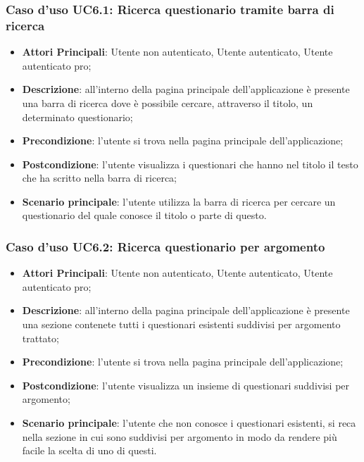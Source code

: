 \subsubsection{Caso d'uso UC6.1: Ricerca questionario tramite barra di ricerca}
\label{UC6.1}
\begin{itemize}
\item\textbf{Attori Principali}: Utente non autenticato, Utente autenticato, Utente autenticato pro;
\item\textbf{Descrizione}: all'interno della pagina principale dell'applicazione è presente una barra di ricerca dove è possibile cercare, attraverso il titolo, un determinato questionario;
\item\textbf{Precondizione}: l'utente si trova nella pagina principale dell'applicazione;
\item\textbf{Postcondizione}: l'utente visualizza i questionari che hanno nel titolo il testo che ha scritto nella barra di ricerca;
\item\textbf{Scenario principale}: l'utente utilizza la barra di ricerca per cercare un questionario del quale conosce il titolo o parte di questo.
\end{itemize}

\subsubsection{Caso d'uso UC6.2: Ricerca questionario per argomento}
\label{UC6.2}
\begin{itemize}
\item\textbf{Attori Principali}: Utente non autenticato, Utente autenticato, Utente autenticato pro;
\item\textbf{Descrizione}: all'interno della pagina principale dell'applicazione è presente una sezione contenete tutti i questionari esistenti suddivisi per argomento trattato;
\item\textbf{Precondizione}: l'utente si trova nella pagina principale dell'applicazione;
\item\textbf{Postcondizione}: l'utente visualizza un insieme di questionari suddivisi per argomento;
\item\textbf{Scenario principale}: l'utente che non conosce i questionari esistenti, si reca nella sezione in cui sono suddivisi per argomento in modo da rendere più facile la scelta di uno di questi. 
\end{itemize}

